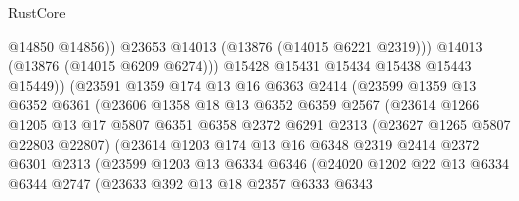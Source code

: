 \begin{lexlean}{RustCore}
\begin{coremodule}
                                @14850
                                @14856))
                            @23653
                            @14013
                            (@13876 (@14015 @6221 @2319)))
                          @14013
                          (@13876 (@14015 @6209 @6274)))
                        @15428
                        @15431
                        @15434
                        @15438
                        @15443
                        @15449))
                    (@23591
                      @1359
                      @174
                      @13
                      @16
                      @6363
                      @2414
                      (@23599
                        @1359
                        @13
                        @6352
                        @6361
                        (@23606
                          @1358
                          @18
                          @13
                          @6352
                          @6359
                          @2567
                          (@23614
                            @1266
                            @1205
                            @13
                            @17
                            @5807
                            @6351
                            @6358
                            @2372
                            @6291
                            @2313
                            (@23627 @1265 @5807 @22803 @22807)
                            (@23614
                              @1203
                              @174
                              @13
                              @16
                              @6348
                              @2319
                              @2414
                              @2372
                              @6301
                              @2313
                              (@23599
                                @1203
                                @13
                                @6334
                                @6346
                                (@24020
                                  @1202
                                  @22
                                  @13
                                  @6334
                                  @6344
                                  @2747
                                  (@23633
                                    @392
                                    @13
                                    @18
                                    @2357
                                    @6333
                                    @6343

\end{coremodule}
\end{lexlean}
